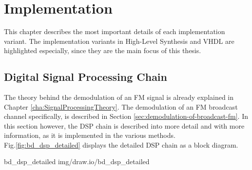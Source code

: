 \chapter{Implementation}
\label{cha:Implementation}

This chapter describes the most important details of each implementation variant.
The implementation variants in High-Level Synthesis and VHDL are highlighted especially, since they are the main focus of this thesis.

\section{Digital Signal Processing Chain}

The theory behind the demodulation of an FM signal is already explained in Chapter \ref{cha:SignalProcessingTheory}.
The demodulation of an FM broadcast channel specifically, is described in Section \ref{sec:demodulation-of-broadcast-fm}.
In this section however, the DSP chain is described into more detail and with more information, as it is implemented in the various methods.\\

Fig.\ref{fig:bd_dsp_detailed} displays the detailed DSP chain as a block diagram.

 {bd_dsp_detailed} {img/draw.io/bd_dsp_detailed}


